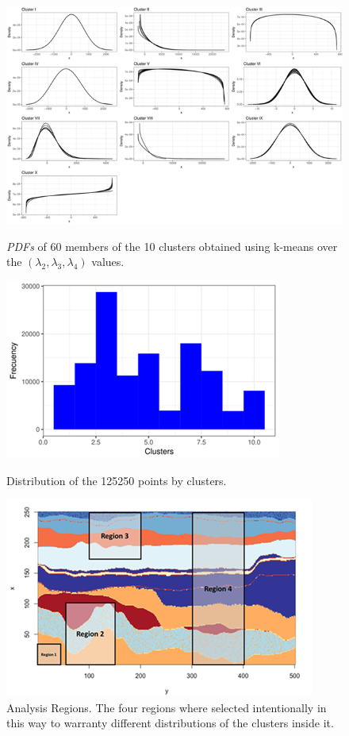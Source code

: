 \documentclass[11pt]{article}
\begin{document}
\begin{figure}[!ht]
\vspace{-2cm}
    \centering
    \includegraphics{figs/clusters2.png}
    \caption{\textit{PDFs} of 60 members of the 10 clusters obtained using k-means over the $(\lambda_{2}, \lambda_{3}, \lambda_{4})$ values.}
    \label{fig:cluster1}
\vspace{0.5cm}

\begin{multicols}{2}
    \centering
    \includegraphics[scale=0.5]{figs/Clusters_histogram.png}
    \caption{Distribution of the 125250 points by clusters.}
    \centering
    \includegraphics{figs/regions_queries.png}
    \caption{Analysis Regions. The four regions where selected intentionally in this way to warranty different distributions of the clusters inside it.}
\end{multicols}
\end{figure}
\end{document}
